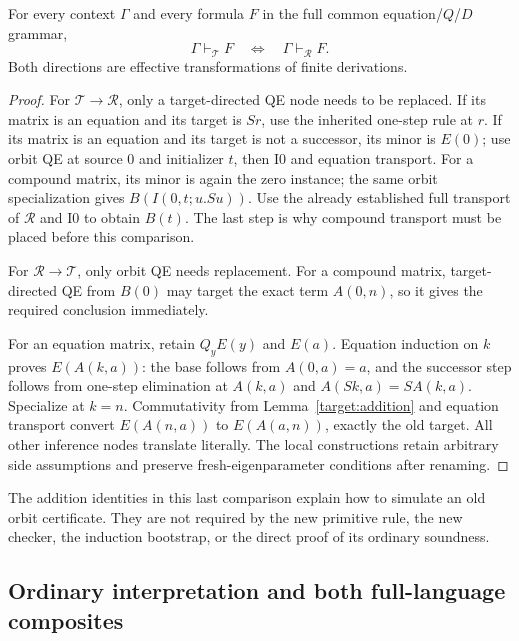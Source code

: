\begin{theorem}
\label{target:exact-equivalence}
For every context $\Gamma$ and every formula $F$ in the full common
equation/$Q$/$D$ grammar,
\[
 \Gamma\vdash_{\mathcal T}F
 \quad\Longleftrightarrow\quad
 \Gamma\vdash_{\mathcal R}F.
\]
Both directions are effective transformations of finite derivations.
\end{theorem}
\begin{proof}
For $\mathcal T\to\mathcal R$, only a target-directed QE node needs to be
replaced.  If its matrix is an equation and its target is $Sr$, use the
inherited one-step rule at $r$.  If its matrix is an equation and its
target is not a successor, its minor is $E(0)$; use orbit QE at source $0$
and initializer $t$, then I0 and equation transport.  For a compound matrix,
its minor is again the zero instance; the same orbit specialization gives
$B(I(0,t;u.Su))$.  Use the already established full transport of
$\mathcal R$ and I0 to obtain $B(t)$.  The last step is why compound
transport must be placed before this comparison.

For $\mathcal R\to\mathcal T$, only orbit QE needs replacement.  For a
compound matrix, target-directed QE from $B(0)$ may target the exact term
$A(0,n)$, so it gives the required conclusion immediately.

For an equation matrix, retain $Q_yE(y)$ and $E(a)$.  Equation induction on
$k$ proves $E(A(k,a))$: the base follows from $A(0,a)=a$, and the successor
step follows from one-step elimination at $A(k,a)$ and
$A(Sk,a)=S A(k,a)$.  Specialize at $k=n$.  Commutativity from
Lemma~\ref{target:addition} and equation transport convert
$E(A(n,a))$ to $E(A(a,n))$, exactly the old target.
All other inference nodes translate literally.  The local constructions
retain arbitrary side assumptions and preserve fresh-eigenparameter
conditions after renaming.
\end{proof}

The addition identities in this last comparison explain how to simulate an
old orbit certificate.  They are not required by the new primitive rule,
the new checker, the induction bootstrap, or the direct proof of its
ordinary soundness.

\subsection{Ordinary interpretation and both full-language composites}
\label{target:biinterpretation-section}


